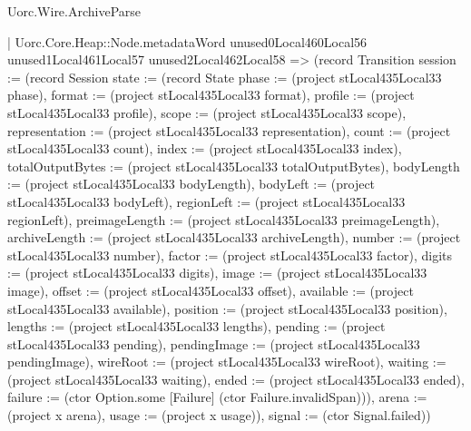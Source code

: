 \begin{lexlean}{Uorc.Wire.ArchiveParse}
\begin{semanticmodule}
{        | Uorc.Core.Heap::Node.metadataWord unused0Local460Local56 unused1Local461Local57 unused2Local462Local58 => (record Transition {session := (record Session {state := (record State {phase := (project stLocal435Local33 phase), format := (project stLocal435Local33 format), profile := (project stLocal435Local33 profile), scope := (project stLocal435Local33 scope), representation := (project stLocal435Local33 representation), count := (project stLocal435Local33 count), index := (project stLocal435Local33 index), totalOutputBytes := (project stLocal435Local33 totalOutputBytes), bodyLength := (project stLocal435Local33 bodyLength), bodyLeft := (project stLocal435Local33 bodyLeft), regionLeft := (project stLocal435Local33 regionLeft), preimageLength := (project stLocal435Local33 preimageLength), archiveLength := (project stLocal435Local33 archiveLength), number := (project stLocal435Local33 number), factor := (project stLocal435Local33 factor), digits := (project stLocal435Local33 digits), image := (project stLocal435Local33 image), offset := (project stLocal435Local33 offset), available := (project stLocal435Local33 available), position := (project stLocal435Local33 position), lengths := (project stLocal435Local33 lengths), pending := (project stLocal435Local33 pending), pendingImage := (project stLocal435Local33 pendingImage), wireRoot := (project stLocal435Local33 wireRoot), waiting := (project stLocal435Local33 waiting), ended := (project stLocal435Local33 ended), failure := (ctor Option.some [Failure] (ctor Failure.invalidSpan))}), arena := (project x arena), usage := (project x usage)}), signal := (ctor Signal.failed)})
}
\end{semanticmodule}
\end{lexlean}
